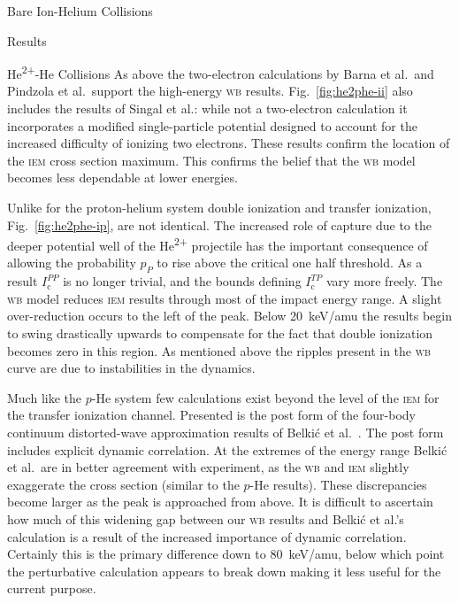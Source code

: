 \documentclass[a5paper, 9 pt]{extreport}
\begin{document}
\begin{chapter}{Bare Ion-Helium Collisions \label{chap:p-he2p-he}}
\begin{section}{Results \label{sec:phe2p-res}}
\begin{subsection}{\texorpdfstring{He\textsuperscript{2+}}{He2+}-He Collisions
                         \label{sec:he2phe-res}}
         As above the two-electron calculations by Barna et al.\ and Pindzola et al.\ support the
         high-energy \textsc{wb} results. Fig.~\ref{fig:he2phe-ii} also includes the results of Singal
         et al.: while not a two-electron calculation it incorporates a modified single-particle
         potential designed to account for the increased difficulty of ionizing two electrons. These
         results confirm the location of the \textsc{iem} cross section maximum. This confirms the
         belief that the \textsc{wb} model becomes less dependable at lower energies.

         Unlike for the proton-helium system double ionization and transfer ionization,
         Fig.~\ref{fig:he2phe-ip}, are not identical. The increased role of capture due to the deeper
         potential well of the He\textsuperscript{2+} projectile has the important consequence of
         allowing the probability $p_P$ to rise above the critical one half threshold. As a result
         $I^{PP}_\mathrm{c}$ is no longer trivial, and the bounds defining $I^{TP}_\mathrm{c}$ vary more
         freely. The \textsc{wb} model reduces \textsc{iem} results through most of the impact energy
         range. A slight over-reduction occurs to the left of the peak. Below 20~keV/amu the results
         begin to swing drastically upwards to compensate for the fact that double ionization becomes
         zero in this region. As mentioned above the ripples present in the \textsc{wb} curve are due to
         instabilities in the dynamics.

         Much like the $p$-He system few calculations exist beyond the level of the \textsc{iem} for the
         transfer ionization channel. Presented is the post form of the four-body continuum
         distorted-wave  approximation results of Belki\'{c} et al.~\cite{BMM-97}. The post form
         includes explicit dynamic correlation. At the extremes of the energy range Belki\'{c} et al.\
         are in better agreement with experiment, as the \textsc{wb} and \textsc{iem} slightly
         exaggerate the cross section (similar to the $p$-He results). These discrepancies become larger
         as the peak is approached from above. It is difficult to ascertain how much of this widening
         gap between our \textsc{wb} results and Belki\'{c} et al.'s calculation is a result of the
         increased importance of dynamic correlation. Certainly this is the primary difference down to
         80~keV/amu, below which point the perturbative calculation appears to break down making it less
         useful for the current purpose.


\end{subsection}
\end{section}
\end{chapter}
\end{document}
